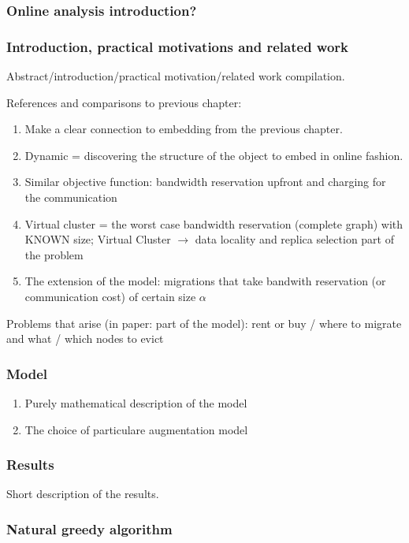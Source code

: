 \documentclass[a4paper]{article}
\begin{document}
\subsubsection{Online analysis introduction?}

\subsubsection{Introduction, practical motivations and related work}

Abstract/introduction/practical motivation/related work compilation.

References and comparisons to previous chapter:
\begin{enumerate}
  \item Make a clear connection to embedding from the previous chapter.
  \item Dynamic = discovering the structure of the object to embed in online fashion.
  \item Similar objective function: bandwidth reservation upfront and charging for the communication
  \item Virtual cluster = the worst case bandwidth reservation (complete graph) with KNOWN size; Virtual Cluster $\rightarrow$ data locality and replica selection part of the problem
  \item The extension of the model: migrations that take bandwith reservation (or communication cost) of certain size $\alpha$
\end{enumerate}

Problems that arise (in paper: part of the model): rent or buy / where to migrate and what / which nodes to evict

\subsubsection{Model}
\begin{enumerate}
  \item Purely mathematical description of the model
  \item The choice of particulare augmentation model
\end{enumerate}
\subsubsection{Results}
Short description of the results.
\subsubsection{Natural greedy algorithm}
\end{document}
